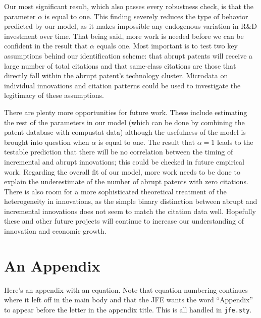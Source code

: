 \documentclass[letterpaper,12pt]{article}
\theoremstyle{definition}
\begin{document}
Our most significant result, which also passes every robustness check, is that the parameter $\alpha$ is equal to one. This finding severely reduces the type of behavior predicted by our model, as it makes impossible any endogenous variation in R\&D investment over time. That being said, more work is needed before we can be confident in the result that $\alpha$ equals one. Most important is to test two key assumptions behind our identification scheme: that abrupt patents will receive a large number of total citations and that same-class citations are those that directly fall within the abrupt patent's technology cluster. Microdata on individual innovations and citation patterns could be used to investigate the legitimacy of these assumptions.

There are plenty more opportunities for future work. These include estimating the rest of the parameters in our model (which can be done by combining the patent database with compustat data) although the usefulness of the model is brought into question when $\alpha$ is equal to one. The result that $\alpha = 1$ leads to the testable prediction that there will be no correlation between the timing of  incremental and abrupt innovations; this could be checked in future empirical work. Regarding the overall fit of our model, more work needs to be done to explain the underestimate of the number of abrupt patents with zero citations. There is also room for a more sophisticated theoretical treatment of the heterogeneity in innovations, as the simple binary distinction between abrupt and incremental innovations does not seem to match the citation data well. Hopefully these and other future projects will continue to increase our understanding of innovation and economic growth.



\nocite{*}


\clearpage

\appendix

\section{An Appendix}
\label{sec:app1}

Here's an appendix with an equation. Note that equation numbering continues where it left off in the main body and that the JFE wants the word ``Appendix'' to appear before the letter in the appendix title. This is all handled in \texttt{jfe.sty}.
\end{document}
